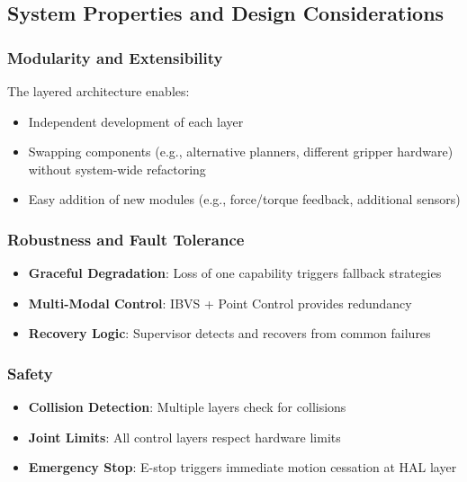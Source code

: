 \subsection{System Properties and Design Considerations}
\label{subsec:system_properties}

\subsubsection{Modularity and Extensibility}
The layered architecture enables:
\begin{itemize}
    \item Independent development of each layer
    \item Swapping components (e.g., alternative planners, different gripper hardware) without system-wide refactoring
    \item Easy addition of new modules (e.g., force/torque feedback, additional sensors)
\end{itemize}

\subsubsection{Robustness and Fault Tolerance}
\begin{itemize}
    \item \textbf{Graceful Degradation}: Loss of one capability triggers fallback strategies
    \item \textbf{Multi-Modal Control}: IBVS + Point Control provides redundancy
    \item \textbf{Recovery Logic}: Supervisor detects and recovers from common failures
\end{itemize}

\subsubsection{Safety}
\begin{itemize}
    \item \textbf{Collision Detection}: Multiple layers check for collisions
    \item \textbf{Joint Limits}: All control layers respect hardware limits
    \item \textbf{Emergency Stop}: E-stop triggers immediate motion cessation at HAL layer
\end{itemize}

